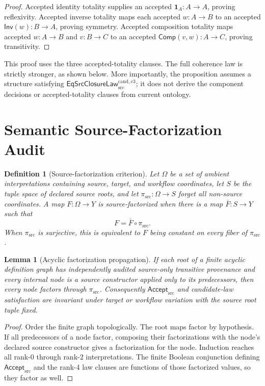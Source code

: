 \documentclass[11pt]{article}
\newtheorem{definition}{Definition}
\newtheorem{lemma}{Lemma}
\newcommand{\Accept}{\mathsf{Accept}_{\mathrm{src}}}
\newcommand{\Law}{\mathsf{EqSrcClosureLaw}^{\mathrm{cand},v3}_{\mathrm{src}}}
\begin{document}
\begin{proof}
Accepted identity totality supplies an accepted
\(\mathbf 1_A:A\to A\), proving reflexivity. Accepted inverse totality maps
each accepted \(w:A\to B\) to an accepted
\(\mathsf{Inv}(w):B\to A\), proving symmetry. Accepted composition totality
maps accepted \(w:A\to B\) and \(v:B\to C\) to an accepted
\(\mathsf{Comp}(v,w):A\to C\), proving transitivity.
\end{proof}

This proof uses the three accepted-totality clauses. The full coherence law is
strictly stronger, as shown below. More importantly, the proposition assumes a
structure satisfying \(\Law\); it does not derive the component decisions or
accepted-totality clauses from current ontology.

\section{Semantic Source-Factorization Audit}

\begin{definition}[Source-factorization criterion]
Let \(\Omega\) be a set of ambient interpretations containing source, target,
and workflow coordinates, let \(S\) be the tuple space of declared source
roots, and let
\(\pi_{\mathrm{src}}:\Omega\to S\) forget all non-source coordinates. A map
\(F:\Omega\to Y\) is source-factorized when there is a map
\(\bar F:S\to Y\) such that
\[
 F=\bar F\circ\pi_{\mathrm{src}}.
\]
When \(\pi_{\mathrm{src}}\) is surjective, this is equivalent to \(F\) being
constant on every fiber of \(\pi_{\mathrm{src}}\).
\end{definition}

\begin{lemma}[Acyclic factorization propagation]
If each root of a finite acyclic definition graph has independently audited
source-only transitive provenance and every internal node is a source
constructor applied only to its predecessors, then every node factors through
\(\pi_{\mathrm{src}}\). Consequently \(\Accept\) and candidate-law
satisfaction are invariant under target or workflow variation with the source
root tuple fixed.
\end{lemma}

\begin{proof}
Order the finite graph topologically. The root maps factor by hypothesis. If
all predecessors of a node factor, composing their factorizations with the
node's declared source constructor gives a factorization for the node.
Induction reaches all rank-0 through rank-2 interpretations. The finite
Boolean conjunction defining \(\Accept\) and the rank-4 law clauses are
functions of those factorized values, so they factor as well.
\end{proof}
\end{document}
